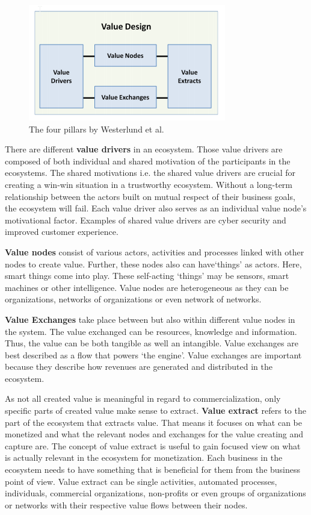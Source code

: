 			\begin{figure}[ht]
			    \begin{center}
			    \includegraphics[scale=1.0]{Talk11/westerlundpillars.png}
			    \end{center}
			    \caption{The four pillars by Westerlund et al. \cite[p.~11]{westerlund}}
			    \label{Westerlund pillars}
			\end{figure}

		There are different \textbf{value drivers} in an ecosystem. Those value drivers are composed of both individual and shared motivation of the participants in the ecosystems. The shared motivations i.e. the shared value drivers are crucial for creating a win-win situation in a trustworthy ecosystem. Without a long-term relationship between the actors built on mutual respect of their business goals, the ecosystem will fail. Each value driver also serves as an individual value node's motivational factor. Examples of shared value drivers are cyber security and improved customer experience.

		\textbf{Value nodes} consist of various actors, activities and processes linked with other nodes to create value. Further, these nodes also can have`things' as actors. Here, smart things come into play. These self-acting `things' may be sensors, smart machines or other intelligence. Value nodes are heterogeneous as they can be organizations, networks of organizations or even network of networks.

		\textbf{Value Exchanges} take place between but also within different value nodes in the system. The value exchanged can be resources, knowledge and information. Thus, the value can be both tangible as well an intangible. Value exchanges are best described as a flow that powers `the engine'. Value exchanges are important because they describe how revenues are generated and distributed in the ecosystem.

		As not all created value is meaningful in regard to commercialization, only specific parts of created value make sense to extract. \textbf{Value extract} refers to the part of the ecosystem that extracts value. That means it focuses on what can be monetized and what the relevant nodes and exchanges for the value creating and capture are. The concept of value extract is useful to gain focused view on what is actually relevant in the ecosystem for monetization. Each business in the ecosystem needs to have something that is beneficial for them from the business point of view. Value extract can be single activities, automated processes, individuals, commercial organizations, non-profits or even groups of organizations or networks with their respective value flows between their nodes.

